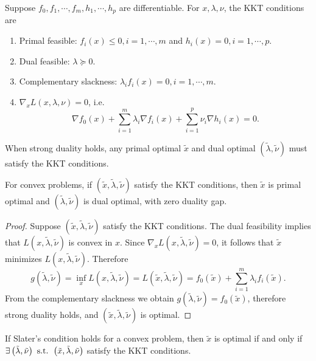 \documentclass[12pt]{article}
\begin{document}
\begin{definition}
    Suppose \(f_0,f_1,\cdots,f_m,h_1,\cdots,h_p\) are differentiable. For \(x,\lambda,\nu\), the \textnormal{KKT conditions} are
    \begin{enumerate}
        \item Primal feasible: \(f_i(x)\leqslant 0,i=1,\cdots,m\) and \(h_i(x)=0,i=1,\cdots,p\).
        \item Dual feasible: \(\lambda\succeq 0\).
        \item Complementary slackness: \(\lambda_if_i(x)=0,i=1,\cdots,m\).
        \item \(\nabla_x L(x,\lambda,\nu)=0\), i.e.
        \[\nabla f_0(x)+\sum_{i=1}^m\lambda_i\nabla f_i(x)+\sum_{i=1}^p\nu_i\nabla h_i(x)=0.\]
    \end{enumerate}
\end{definition}

\begin{theorem}
    When strong duality holds, any primal optimal \(\tilde x\) and dual optimal \(\left(\tilde\lambda,\tilde\nu\right)\) must satisfy the KKT conditions.
\end{theorem}

\begin{theorem}
    For convex problems, if \(\left(\tilde x,\tilde\lambda,\tilde\nu\right)\) satisfy the KKT conditions, then \(\tilde x\) is primal optimal and \(\left(\tilde\lambda,\tilde\nu\right)\) is dual optimal, with zero duality gap.
\end{theorem}
\begin{proof}
    Suppose \(\left(\tilde x,\tilde\lambda,\tilde\nu\right)\) satisfy the KKT conditions. The dual feasibility implies that \(L\left(x,\tilde\lambda,\tilde\nu\right)\) is convex in \(x\). Since \(\nabla_xL\left(x,\tilde\lambda,\tilde\nu\right)=0\), it follows that \(\tilde x\) minimizes \(L\left(x,\tilde\lambda,\tilde\nu\right)\). Therefore
    \[g\left(\tilde\lambda,\tilde\nu\right)=\inf_xL\left(x,\tilde\lambda,\tilde\nu\right)=L\left(\tilde x,\tilde\lambda,\tilde\nu\right)=f_0\left(\tilde x\right)+\sum_{i=1}^m\lambda_if_i\left(\tilde x\right).\]
    From the complementary slackness we obtain \(g\left(\tilde\lambda,\tilde\nu\right)=f_0\left(\tilde x\right)\), therefore strong duality holds, and \(\left(\tilde x,\tilde\lambda,\tilde\nu\right)\) is optimal.
\end{proof}

\begin{corollary}
    If Slater's condition holds for a convex problem, then \(\tilde x\) is optimal if and only if \(\exists\left(\tilde\lambda,\tilde\nu\right)\textnormal{ s.t. }\left(\tilde x,\tilde\lambda,\tilde\nu\right)\) satisfy the KKT conditions.
\end{corollary}
\end{document}
